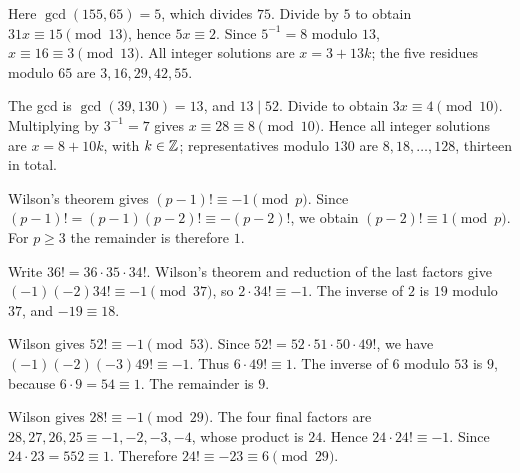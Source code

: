 Here $\gcd(155,65)=5$, which divides $75$. Divide by $5$ to obtain $31x\equiv15\pmod {13}$, hence $5x\equiv2$. Since $5^{-1}=8$ modulo $13$, $x\equiv16\equiv3\pmod {13}$. All integer solutions are $x=3+13k$; the five residues modulo $65$ are $\boxed{3,16,29,42,55}$.

The gcd is $\gcd(39,130)=13$, and $13\mid52$. Divide to obtain $3x\equiv4\pmod {10}$. Multiplying by $3^{-1}=7$ gives $x\equiv28\equiv8\pmod {10}$. Hence all integer solutions are $\boxed{x=8+10k}$, with $k\in\mathbb{Z}$; representatives modulo $130$ are $8,18,\ldots,128$, thirteen in total.

Wilson's theorem gives $(p-1)!\equiv-1\pmod p$. Since $(p-1)!=(p-1)(p-2)!\equiv-(p-2)!$, we obtain $\boxed{(p-2)!\equiv1\pmod p}$. For $p\ge3$ the remainder is therefore $1$.

Write $36!=36\cdot35\cdot34!$. Wilson's theorem and reduction of the last factors give $(-1)(-2)34!\equiv-1\pmod {37}$, so $2\cdot34!\equiv-1$. The inverse of $2$ is $19$ modulo $37$, and $-19\equiv\boxed {18}$.

Wilson gives $52!\equiv-1\pmod {53}$. Since $52!=52\cdot51\cdot50\cdot49!$, we have $(-1)(-2)(-3)49!\equiv-1$. Thus $6\cdot49!\equiv1$. The inverse of $6$ modulo $53$ is $9$, because $6\cdot9=54\equiv1$. The remainder is $\boxed9$.

Wilson gives $28!\equiv-1\pmod {29}$. The four final factors are $28,27,26,25\equiv-1,-2,-3,-4$, whose product is $24$. Hence $24\cdot24!\equiv-1$. Since $24\cdot23=552\equiv1$. Therefore $24!\equiv-23\equiv\boxed6\pmod {29}$.

